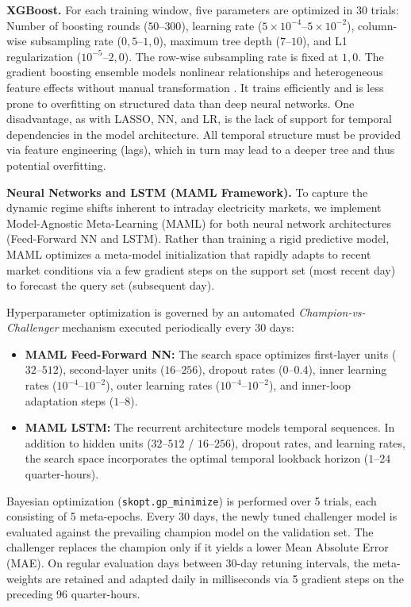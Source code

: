 \documentclass[preprint,12pt,nonatbib]{elsarticle}
\begin{document}
\textbf{XGBoost.}
For each training window, five parameters are optimized in 30 trials:
Number of boosting rounds ($50$–$300$), learning rate ($5\times10^{-4}$–$5\times10^{-2}$), column-wise subsampling rate ($0{,} 5$–$1{,}0$), maximum tree depth ($7$–$10$), and L1 regularization ($10^{-5}$–$2{,}0$).
The row-wise subsampling rate is fixed at $1{,}0$.
The gradient boosting ensemble models nonlinear relationships and heterogeneous feature effects without manual transformation \cite{Chen.2016}.
It trains efficiently and is less prone to overfitting on structured data than deep neural networks.
One disadvantage, as with LASSO, NN, and LR, is the lack of support for temporal dependencies in the model architecture.
All temporal structure must be provided via feature engineering (lags), which in turn may lead to a deeper tree and thus potential overfitting.

\textbf{Neural Networks and LSTM (MAML Framework).}
To capture the dynamic regime shifts inherent to intraday electricity markets, we implement Model-Agnostic Meta-Learning (MAML) \cite{Finn.2017} for both neural network architectures (Feed-Forward NN and LSTM).
Rather than training a rigid predictive model, MAML optimizes a meta-model initialization that rapidly adapts to recent market conditions via a few gradient steps on the support set (most recent day) to forecast the query set (subsequent day).

Hyperparameter optimization is governed by an automated \textit{Champion-vs-Challenger} mechanism executed periodically every 30 days:
\begin{itemize}
    \item \textbf{MAML Feed-Forward NN:} The search space optimizes first-layer units ($32$--$512$), second-layer units ($16$--$256$), dropout rates ($0$--$0.4$), inner learning rates ($10^{-4}$--$10^{-2}$), outer learning rates ($10^{-4}$--$10^{-2}$), and inner-loop adaptation steps ($1$--$8$).
    \item \textbf{MAML LSTM:} The recurrent architecture models temporal sequences. In addition to hidden units ($32$--$512$ / $16$--$256$), dropout rates, and learning rates, the search space incorporates the optimal temporal lookback horizon ($1$--$24$ quarter-hours).
\end{itemize}
Bayesian optimization (\texttt{skopt.gp\_minimize}) is performed over 5 trials, each consisting of 5 meta-epochs. Every 30 days, the newly tuned challenger model is evaluated against the prevailing champion model on the validation set. The challenger replaces the champion only if it yields a lower Mean Absolute Error (MAE).
On regular evaluation days between 30-day retuning intervals, the meta-weights are retained and adapted daily in milliseconds via 5 gradient steps on the preceding 96 quarter-hours.
\end{document}
